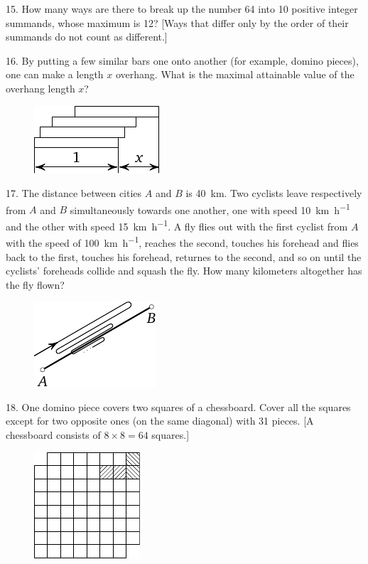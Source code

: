 \begin{problem}{15.}
	How many ways are there to break up the number 64 into 10 positive integer summands, whose maximum is 12? [Ways that differ only by the order of their summands do not count as different.]
\end{problem}

\begin{problem}{16.}
	By putting a few similar bars one onto another (for example, domino pieces),
	one can make a length $x$ overhang. What is the maximal attainable value of the overhang length $x$?
	\begin{figure}
		\includegraphics{taskbook-97}
	\end{figure}
\end{problem}

\begin{problem}{17.}
	The distance between cities $A$ and $B$ is \SI{40}{\km}. Two cyclists leave respectively from $A$ and $B$ simultaneously
	towards one another, one with speed \SI{10}{\km\per\hour} and the other with speed \SI{15}{\km\per\hour}. A fly flies out with the first
	cyclist from $A$ with the speed of \SI{100}{\km\per\hour}, reaches the second, touches his forehead and flies back to the first,
	touches his forehead, returnes to the second, and so on until the cyclists' foreheads collide and squash
	the fly.
	How many kilometers altogether has the fly flown?
	\begin{figure}
		\includegraphics{taskbook-1}
	\end{figure}
\end{problem}

\begin{problem}{18.}
	One domino piece covers two squares of a chessboard. 
	Cover all the squares
	except for two opposite ones (on the same diagonal) with 31 pieces. [A chessboard consists of $8 \times 8 = 64$ squares.]
	\begin{figure}
		\includegraphics{taskbook-2}
	\end{figure}
\end{problem}

